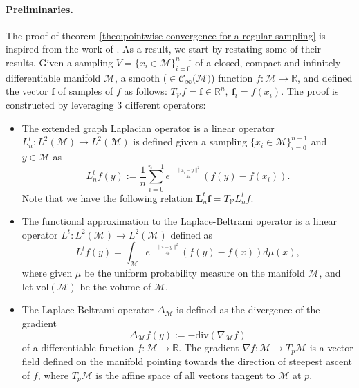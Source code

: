 \documentclass{article} %
\renewcommand{\b}[1]{{\bm{#1}}}  %
\newcommand{\R}{\mathbb{R}}
\newcommand{\V}{\mathcal{V}}  %
\begin{document}
\paragraph{Preliminaries.}
The proof of theorem \ref{theo:pointwise convergence for a regular sampling} is inspired from the work of \cite{belkin2005towards}. As a result, we start by restating some of their results.
Given a sampling $V = \{x_i\in\mathcal M\}_{i=0}^{n-1}$ of a closed, compact and infinitely differentiable manifold $\mathcal{M}$, a smooth ($\in\mathcal{C}_\infty(\mathcal{M)}$) function  $f:\mathcal{M} \rightarrow \mathbb{R}$, and defined the vector $\b{f}$ of samples of $f$ as follows: $T_\V f = \b{f} \in \mathbb{R}^n,\ \b{f}_i = f(x_i)$.
The proof is constructed by leveraging 3 different operators:
\begin{itemize}
    \item The extended graph Laplacian operator is a linear operator $L_n^t: L^{2}(\mathcal{M}) \rightarrow L^{2}(\mathcal{M})$  is defined given a sampling $\{x_i\in\mathcal M\}_{i=0}^{n-1}$ and $y\in \mathcal{M}$  as
	\begin{equation}
	\label{eq:Heat Kernel Graph Laplacian operator}
	 L_n^tf(y) := \frac{1}{n}\sum_{i=0}^{n-1} e^{ -\frac{\|x_i-y\|^2}{4t}} \left(f(y)-f(x_i)\right).
	\end{equation}
	Note that we have the following relation $\b{L}_n^t \b{f} = T_\V L_n^t f$.
	\item The functional approximation to the Laplace-Beltrami operator is a linear operator $L^t: L^{2}(\mathcal{M}) \rightarrow L^{2}(\mathcal{M})$ defined  as
	\begin{equation}
    \label{eq:Functional approximation to the Laplace-Beltrami operator}
	L^tf(y) = \int_{\mathcal{M}} e^{-\frac{\|x-y\|^2}{4t}}\left(f(y)-f(x)\right)d\mu(x),
	\end{equation}
	where given $\mu$ be the uniform probability measure on the manifold $\mathcal{M}$, and let $\text{vol}(\mathcal{M})$ be the volume of $\mathcal{M}$.
	\item
	The Laplace-Beltrami operator $\Delta_{\mathcal{M}}$ is defined as the divergence of the gradient
	\begin{equation}
        \label{eq:laplace-beltrami}
        \Delta_{\mathcal M}f(y):= -\text{div}(\nabla_{\mathcal M}f)
    \end{equation}
    of a differentiable function $f: \mathcal M\rightarrow \R$. The gradient $\nabla f: \mathcal M \rightarrow T_p\mathcal M$ is a vector field defined on the manifold pointing towards the direction of steepest ascent of $f$, where $T_p\mathcal M$ is the affine space of all vectors tangent to $\mathcal M$ at $p$.

\end{itemize}
\end{document}

